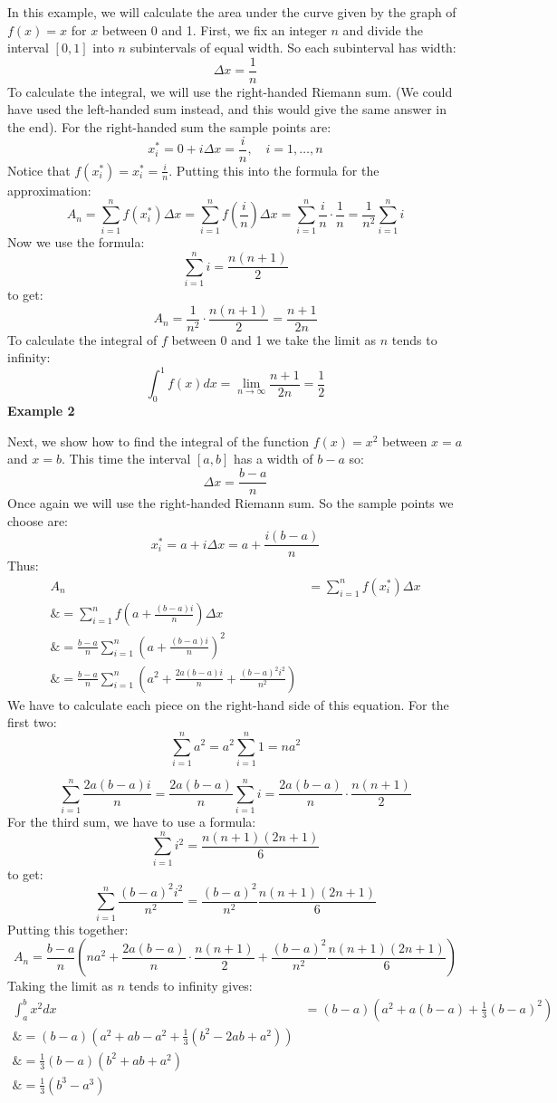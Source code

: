 In this example, we will calculate the area under the curve given by the graph of $f(x) = x$ for $x$ between 0 and 1. First, we fix an integer $n$ and divide the interval $[0,1]$ into $n$ subintervals of equal width. So each subinterval has width:
$$
\Delta x = \frac{1}{n}
$$
To calculate the integral, we will use the right-handed Riemann sum. (We could have used the left-handed sum instead, and this would give the same answer in the end). For the right-handed sum the sample points are:
$$
x_i^* = 0 + i \Delta x = \frac{i}{n}, \quad i = 1,\ldots,n
$$
Notice that $f(x_i^*) = x_i^* = \frac{i}{n}$. Putting this into the formula for the approximation:
$$
A_n = \sum_{i=1}^n f(x_{i}^*) \Delta x = \sum_{i=1}^n f\left(\frac{i}{n}\right) \Delta x = \sum_{i=1}^n \frac{i}{n} \cdot \frac{1}{n} = \frac{1}{n^2} \sum_{i=1}^n i
$$
Now we use the formula:
$$
\sum_{i=1}^n i = \frac{n(n+1)}{2}
$$
to get:
$$
A_n = \frac{1}{n^2} \cdot \frac{n(n+1)}{2} = \frac{n+1}{2n}
$$
To calculate the integral of $f$ between 0 and 1 we take the limit as $n$ tends to infinity:
$$
\int_0^1 f(x) dx = \lim_{n \to \infty} \frac{n+1}{2n} = \frac{1}{2}
$$
\textbf{Example 2}



Next, we show how to find the integral of the function $f(x) = x^2$ between $x = a$ and $x = b$. This time the interval $[a,b]$ has a width of $b-a$ so:
$$
\Delta x = \frac{b-a}{n}
$$
Once again we will use the right-handed Riemann sum. So the sample points we choose are:
$$
x_i^* = a + i \Delta x = a + \frac{i(b-a)}{n}
$$
Thus:
\begin{align}
A_n &= \sum_{i=1}^n f(x_{i}^*) \Delta x \\\&= \sum_{i=1}^n f\left(a + \frac{(b-a)i}{n}\right) \Delta x \\\&= \frac{b-a}{n} \sum_{i=1}^n \left(a + \frac{(b-a)i}{n}\right)^2 \\\&= \frac{b-a}{n} \sum_{i=1}^n \left(a^2 + \frac{2a(b-a)i}{n} + \frac{(b-a)^2 i^2}{n^2}\right)
\end{align}
We have to calculate each piece on the right-hand side of this equation. For the first two:
$$
\sum_{i=1}^n a^2 = a^2 \sum_{i=1}^n 1 = n a^2
$$



$$
\sum_{i=1}^n \frac{2a(b-a)i}{n} = \frac{2a(b-a)}{n} \sum_{i=1}^n i = \frac{2a(b-a)}{n} \cdot \frac{n(n+1)}{2}
$$
For the third sum, we have to use a formula:
$$
\sum_{i=1}^n i^2 = \frac{n(n+1)(2n+1)}{6}
$$
to get:
$$
\sum_{i=1}^n \frac{(b-a)^2 i^2}{n^2} = \frac{(b-a)^2}{n^2} \frac{n(n+1)(2n+1)}{6}
$$
Putting this together:
$$
A_n = \frac{b-a}{n}\left(na^2 + \frac{2a(b-a)}{n} \cdot \frac{n(n+1)}{2} + \frac{(b-a)^2}{n^2} \frac{n(n+1)(2n+1)}{6}\right)
$$
Taking the limit as $n$ tends to infinity gives:
\begin{align}
\int_a^b x^2 dx &= (b-a)\left(a^2 + a(b-a) + \frac{1}{3}(b-a)^2\right) \\\&= (b-a)\left(a^2 + ab - a^2 + \frac{1}{3}(b^2 - 2ab + a^2)\right) \\\&= \frac{1}{3}(b-a)(b^2 + ab + a^2) \\\&= \frac{1}{3}(b^3 - a^3)
\end{align}
